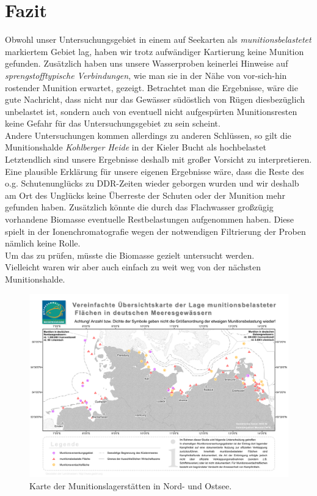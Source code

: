 
\chapter[Fazit]{Fazit}

Obwohl unser Untersuchungsgebiet in einem auf Seekarten als \emph{munitionsbelastetet} markiertem Gebiet lag, haben wir trotz aufwändiger Kartierung keine Munition gefunden. Zusätzlich haben uns unsere Wasserproben keinerlei Hinweise auf \emph{sprengstofftypische Verbindungen}, wie man sie in der Nähe von vor-sich-hin rostender Munition erwartet, gezeigt. Betrachtet man die Ergebnisse, wäre die gute Nachricht, dass nicht nur das Gewässer südöstlich von Rügen diesbezüglich unbelastet ist, sondern auch von eventuell nicht aufgespürten Munitionsresten keine Gefahr für das Untersuchungsgebiet zu sein scheint. \\
Andere Untersuchungen kommen allerdings zu anderen Schlüssen, so gilt die Munitionshalde \emph{Kohlberger Heide} in der Kieler Bucht als hochbelastet\cite{kohl} \\
Letztendlich sind unsere Ergebnisse deshalb mit großer Vorsicht zu interpretieren. \\
Eine plausible Erklärung für unsere eigenen Ergebnisse wäre, dass die Reste des o.g. Schutenunglücks zu DDR-Zeiten wieder geborgen wurden und wir deshalb am Ort des Unglücks keine Überreste der Schuten oder der Munition mehr gefunden haben.
Zusätzlich könnte die durch das Flachwasser großzügig vorhandene Biomasse eventuelle Restbelastungen aufgenommen haben. Diese spielt in der Ionenchromatografie wegen der notwendigen Filtrierung der Proben nämlich keine Rolle. \\
Um das zu prüfen, müsste die Biomasse gezielt untersucht werden.\\
Vielleicht waren wir aber auch einfach zu weit weg von der nächsten Munitionshalde.\\
\begin{figure}[htb]
\includegraphics[height=\textheight,%
                   width=\textwidth,%
                   keepaspectratio]{Bilder/karte_muni.PDF}
\caption{Karte der Munitionslagerstätten in Nord- und Ostsee\cite{shmuni}.}
\end{figure}

